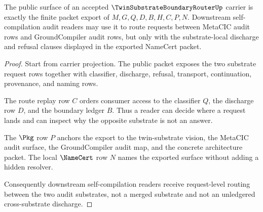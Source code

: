 \begin{theorem}
\label{thm:twin-substrate-boundary-router-public-surface}
The public surface of an accepted $\TwinSubstrateBoundaryRouterUp$ carrier is exactly the finite packet export of $M,G,Q,D,B,H,C,P,N$. Downstream self-compilation audit readers may use it to route requests between MetaCIC audit rows and GroundCompiler audit rows, but only with the substrate-local discharge and refusal clauses displayed in the exported NameCert packet.
\end{theorem}
\begin{proof}
Start from carrier projection. The public packet exposes the two substrate request rows together with classifier, discharge, refusal, transport, continuation, provenance, and naming rows.

The route replay row $C$ orders consumer access to the classifier $Q$, the discharge row $D$, and the boundary ledger $B$. Thus a reader can decide where a request lands and can inspect why the opposite substrate is not an answer.

The $\Pkg$ row $P$ anchors the export to the twin-substrate vision, the MetaCIC audit surface, the GroundCompiler audit map, and the concrete architecture packet. The local $\NameCert$ row $N$ names the exported surface without adding a hidden resolver.

Consequently downstream self-compilation readers receive request-level routing between the two audit substrates, not a merged substrate and not an unledgered cross-substrate discharge.
\end{proof}


\begin{closurestatus}{\TwinSubstrateBoundaryRouterUp}
  \theoryclosure{\seedClosure}
  \formalstatus{\unformalizedV}
\end{closurestatus}
